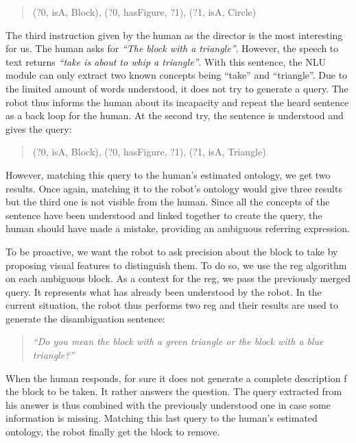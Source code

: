 \begin{quote} 
\centering 
(?0, isA, Block), (?0, hasFigure, ?1), (?1, isA, Circle)
\end{quote}

The third instruction given by the human as the director is the most interesting for us. The human asks for \textit{``The block with a triangle''}. However, the speech to text returns \textit{``take is about to whip a triangle''}. With this sentence, the NLU module can only extract two known concepts being ``take'' and ``triangle''. Due to the limited amount of words understood, it does not try to generate a \sparql{} query. The robot thus informs the human about its incapacity and repeat the heard sentence as a back loop for the human. At the second try, the sentence is understood and gives the query:

\begin{quote} 
\centering 
(?0, isA, Block), (?0, hasFigure, ?1), (?1, isA, Triangle)
\end{quote}

However, matching this query to the human's estimated ontology, we get two results. Once again, matching it to the robot's ontology would give three results but the third one is not visible from the human. Since all the concepts of the sentence have been understood and linked together to create the query, the human should have made a mistake, providing an ambiguous referring expression.

To be proactive, we want the robot to ask precision about the block to take by proposing visual features to distinguish them. To do so, we use the \acrshort{reg} algorithm on each ambiguous block. As a context for the \acrshort{reg}, we pass the previously merged \sparql{} query. It represents what has already been understood by the robot. In the current situation, the robot thus performs two \acrshort{reg} and their results are used to generate the disambiguation sentence:

\begin{quote} 
\centering 
\textit{``Do you mean the block with a green triangle or the block with a blue triangle?''}
\end{quote}

When the human responds, for sure it does not generate a complete description f the block to be taken. It rather answers the question. The query extracted from his answer is thus combined with the previously understood one in case some information is missing. Matching this last query to the human's estimated ontology, the robot finally get the block to remove.

